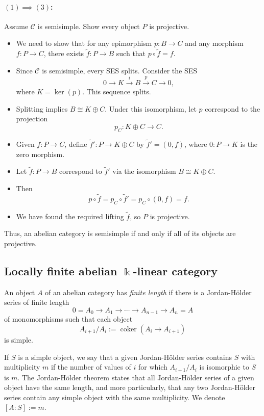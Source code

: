 \documentclass[11pt]{article}
\theoremstyle{definition}
\begin{document}
\paragraph{\((1) \implies (3)\):} Assume \(\mathcal{C}\) is semisimple. Show every object \(P\) is projective.
\begin{itemize}
    \item We need to show that for any epimorphism \(p: B \to C\) and any morphism \(f: P \to C\), there exists \(\tilde{f}: P \to B\) such that \(p \circ \tilde{f} = f\).
    \item Since \(\mathcal{C}\) is semisimple, every SES splits. Consider the SES
    \[
    0 \to K \xrightarrow{i} B \xrightarrow{p} C \to 0,
    \]
    where \(K = \ker(p)\). This sequence splits.
    \item Splitting implies \(B \cong K \oplus C\). Under this isomorphism, let \(p\) correspond to the projection
    \[
    p_C: K \oplus C \to C.
    \]
    \item Given \(f: P \to C\), define \(\tilde{f}': P \to K \oplus C\) by \(\tilde{f}' = (0, f)\), where \(0: P \to K\) is the zero morphism.
    \item Let \(\tilde{f}: P \to B\) correspond to \(\tilde{f}'\) via the isomorphism \(B \cong K \oplus C\).
    \item Then
    \[
    p \circ \tilde{f} = p_C \circ \tilde{f}' = p_C \circ (0, f) = f.
    \]
    \item We have found the required lifting \(\tilde{f}\), so \(P\) is projective.
\end{itemize}

Thus, an abelian category is semisimple if and only if all of its objects are projective.




\subsection{Locally finite abelian \(\Bbbk\)-linear category}

An object \(A\) of an abelian category has \emph{finite length} if there is a Jordan-Hölder series of finite length
\[
0 = A_0 \to A_1 \to \cdots \to A_{n-1} \to A_n = A
\]
of monomorphisms such that each object
\[
A_{i+1}/A_i := \operatorname{coker}(A_i \to A_{i+1})
\]
is simple.

If \(S\) is a simple object, we say that a given Jordan-Hölder series contains \(S\) with multiplicity \(m\) if the number of values of \(i\) for which \(A_{i+1}/A_i\) is isomorphic to \(S\) is \(m\). The Jordan-Hölder theorem states that all Jordan-Hölder series of a given object have the same length, and more particularly, that any two Jordan-Hölder series contain any simple object with the same multiplicity. We denote \([A:S] := m\).
\end{document}
